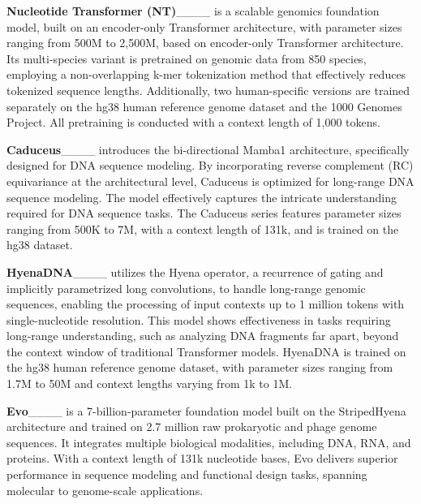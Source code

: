 \textbf{Nucleotide Transformer (NT)}____ is a scalable genomics foundation model, built on an encoder-only Transformer architecture, with parameter sizes ranging from 500M to 2,500M, based on encoder-only Transformer architecture. 
Its multi-species variant is pretrained on genomic data from 850 species, employing a non-overlapping k-mer tokenization method that effectively reduces tokenized sequence lengths. 
Additionally, two human-specific versions are trained separately on the hg38 human reference genome dataset and the 1000 Genomes Project. All pretraining is conducted with a context length of 1,000 tokens. 

\textbf{Caduceus}____ introduces the bi-directional Mamba1 architecture, specifically designed for DNA sequence modeling. By incorporating reverse complement (RC) equivariance at the architectural level, Caduceus is optimized for long-range DNA sequence modeling. The model effectively captures the intricate understanding required for DNA sequence tasks. The Caduceus series features parameter sizes ranging from 500K to 7M, with a context length of 131k, and is trained on the hg38 dataset.

\textbf{HyenaDNA}____ utilizes the Hyena operator, a recurrence of gating and implicitly parametrized long convolutions, to handle long-range genomic sequences, enabling the processing of input contexts up to 1 million tokens with single-nucleotide resolution. 
This model shows effectiveness in tasks requiring long-range understanding, such as analyzing DNA fragments far apart, beyond the context window of traditional Transformer models. HyenaDNA is trained on the hg38 human reference genome dataset, with parameter sizes ranging from 1.7M to 50M and context lengths varying from 1k to 1M.

\textbf{Evo}____ is a 7-billion-parameter foundation model built on the StripedHyena architecture and trained on 2.7 million raw prokaryotic and phage genome sequences. 
It integrates multiple biological modalities, including DNA, RNA, and proteins. With a context length of 131k nucleotide bases, Evo delivers superior performance in sequence modeling and functional design tasks, spanning molecular to genome-scale applications.

